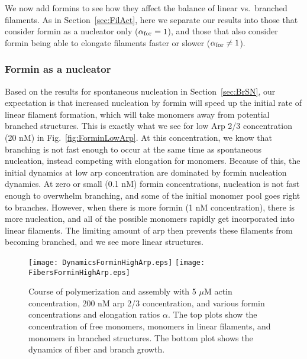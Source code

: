 \documentclass[11pt]{article}
\begin{document}
We now add formins to see how they affect the balance of linear vs.\ branched filaments. As in Section\ \ref{sec:FilAct}, here we separate our results into those that consider formin as a nucleator only ($\alpha_\text{for}=1$), and those that also consider formin being able to elongate filaments faster or slower ($\alpha_\text{for} \neq 1$). 

\subsubsection{Formin as a nucleator}
Based on the results for spontaneous nucleation in Section\ \ref{sec:BrSN}, our expectation is that increased nucleation by formin will speed up the initial rate of linear filament formation, which will take monomers away from potential branched structures. This is exactly what we see for low Arp 2/3 concentration (20 nM) in Fig.\ \ref{fig:ForminLowArp}. At this concentration, we know that branching is not fast enough to occur at the same time as spontaneous nucleation, instead competing with elongation for monomers. Because of this, the initial dynamics at low arp concentration are dominated by formin nucleation dynamics. At zero or small (0.1 nM) formin concentrations, nucleation is not fast enough to overwhelm branching, and some of the initial monomer pool goes right to branches. However, when there is more formin (1 nM concentration), there is more nucleation, and all of the possible monomers rapidly get incorporated into linear filaments. The limiting amount of arp then prevents these filaments from becoming branched, and we see more linear structures. 

\begin{figure}
\centering
\texttt{[image: DynamicsForminHighArp.eps]}
\texttt{[image: FibersForminHighArp.eps]}
\caption{\label{fig:ForminHighArp}Course of polymerization and assembly with 5 $\mu$M actin concentration, 200 nM arp 2/3 concentration, and various formin concentrations and elongation ratios $\alpha$. The top plots show the concentration of free monomers, monomers in linear filaments, and monomers in branched structures. The bottom plot shows the dynamics of fiber and branch growth. }
\end{figure}
\end{document}
